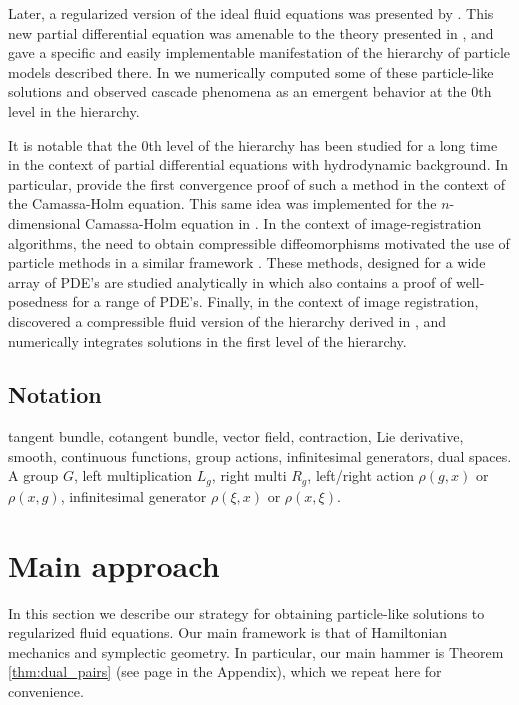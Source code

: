 \documentclass[12pt]{amsart}
\begin{document}
 Later, a regularized version of the ideal fluid equations was presented by
 \cite{MumfordMichor2013}.
 This new partial differential equation was amenable to the theory presented in 
 \cite{JacobsRatiuDesbrun2013}, and gave a specific and easily
 implementable manifestation of the hierarchy of particle models
 described there.
 In \cite{CotterHolmJacobsMeier2014} we numerically computed some
 of these particle-like solutions and observed cascade phenomena as
 an emergent behavior at the $0$th level in the hierarchy.

 It is notable that the $0$th level of the hierarchy has been studied
 for a long time in the context of partial differential equations with hydrodynamic background.
 In particular, \cite{HoldenRaynaud2006} provide the first convergence proof of such a method in the context of the Camassa-Holm equation.
 This same idea was implemented for the $n$-dimensional Camassa-Holm
 equation in \cite{ChertockDuToitMarsden2012}.
 In the context of image-registration algorithms, the need to obtain 
 compressible diffeomorphisms motivated the use of particle methods
 in a similar framework \cite{JoshiMiller2000}.
 These methods, designed for a wide array of PDE's are studied analytically
 in \cite{TrouveYounes2005} which also contains a proof of well-posedness
 for a range of PDE's.
 Finally, in the context of image registration, \cite{Sommer2013} 
 discovered a compressible fluid version of the hierarchy derived in \cite{JacobsRatiuDesbrun2013},
 and numerically integrates solutions in the first level of the hierarchy.

\subsection{Notation}
tangent bundle, cotangent bundle, vector field, contraction, Lie derivative,
smooth, continuous functions, group actions, infinitesimal generators,
dual spaces.  A group $G$, left multiplication $L_g$, right multi $R_g$, 
left/right action $\rho(g,x)$ or $\rho(x,g)$, infinitesimal generator $\rho(\xi,x)$ or $\rho(x,\xi)$.



\section{Main approach}
\label{sec:approach}
In this section we describe our strategy for obtaining
particle-like solutions to regularized fluid equations.
Our main framework is that of Hamiltonian mechanics
and symplectic geometry.
In particular, our main hammer is Theorem \ref{thm:dual_pairs} (see page 
\pageref{thm:dual_pairs} in the Appendix), which we repeat
here for convenience.
\end{document}
